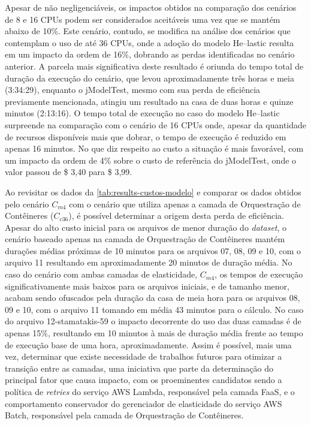 \documentclass[english,brazilian]{UNISINOSmonografia} %
\begin{document}
Apesar de não negligenciáveis, os impactos obtidos na comparação dos cenários de 8 e 16 CPUs podem ser considerados aceitáveis uma vez que se mantém abaixo de 10\%.
%
Este cenário, contudo, se modifica na análise dos cenários que contemplam o uso de até 36 CPUs, onde a adoção do modelo \textsf{He}--lastic resulta em um impacto da ordem de 16\%, dobrando as perdas identificadas no cenário anterior.
%
A parcela mais significativa deste resultado é oriunda do tempo total de duração da execução do cenário, que levou aproximadamente três horas e meia (3:34:29), enquanto o jModelTest, mesmo com sua perda de eficiência previamente mencionada, atingiu um resultado na casa de duas horas e quinze minutos (2:13:16).
O tempo total de execução no caso do modelo \textsf{He}--lastic surpreende na comparação com o cenário de 16 CPUs onde, apesar da quantidade de recursos disponíveis mais que dobrar, o tempo de execução é reduzido em apenas 16 minutos.
%
No que diz respeito ao custo a situação é mais favorável, com um impacto da ordem de 4\% sobre o custo de referência do jModelTest, onde o valor passou de \$ 3,40 para \$ 3,99.



Ao revisitar os dados da \autoref{tab:results-custos-modelo} e comparar os dados obtidos pelo cenário $C_{m4}$ com o cenário que utiliza apenas a camada de Orquestração de Contêineres ($C_{c36}$), é possível determinar a origem desta perda de eficiência.
%
Apesar do alto custo inicial para os arquivos de menor duração do \textit{dataset}, o cenário baseado apenas na camada de Orquestração de Contêineres mantém durações médias próximas de 10 minutos para os arquivos 07, 08, 09 e 10, com o arquivo 11 resultando em aproximadamente 20 minutos de duração média.
%
No caso do cenário com ambas camadas de elasticidade, $C_{m4}$, os tempos de execução significativamente mais baixos para os arquivos iniciais, e de tamanho menor, acabam sendo ofuscados pela duração da casa de meia hora para os arquivos 08, 09 e 10, com o arquivo 11 tomando em média 43 minutos para o cálculo.
%
No caso do arquivo 12-stamatakis-59 o impacto decorrente do uso das duas camadas é de apenas 15\%, resultando em 10 minutos à mais de duração média frente ao tempo de execução base de uma hora, aproximadamente.
%
Assim é possível, mais uma vez, determinar que existe necessidade de trabalhos futuros para otimizar a transição entre as camadas, uma iniciativa que parte da determinação do principal fator que causa impacto, com os proeminentes candidatos sendo a política de \textit{retries} do serviço AWS Lambda, responsável pela camada FaaS, e o comportamento conservador do gerenciador de elasticidade do serviço AWS Batch, responsável pela camada de Orquestração de Contêineres.
\end{document}

